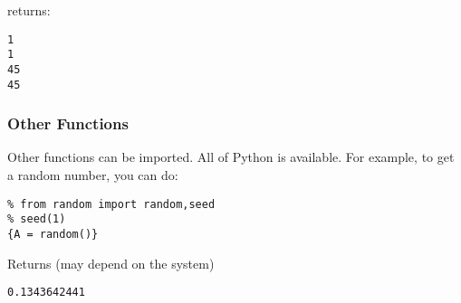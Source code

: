 returns:

\begin{verbatim}
1
1
45
45
\end{verbatim}

\subsubsection{Other Functions}\label{other-functions}

Other functions can be imported. All of Python is available. For
example, to get a random number, you can do:

\begin{verbatim}
% from random import random,seed
% seed(1)
{A = random()}
\end{verbatim}

Returns (may depend on the system)

\begin{verbatim}
0.1343642441
\end{verbatim}
